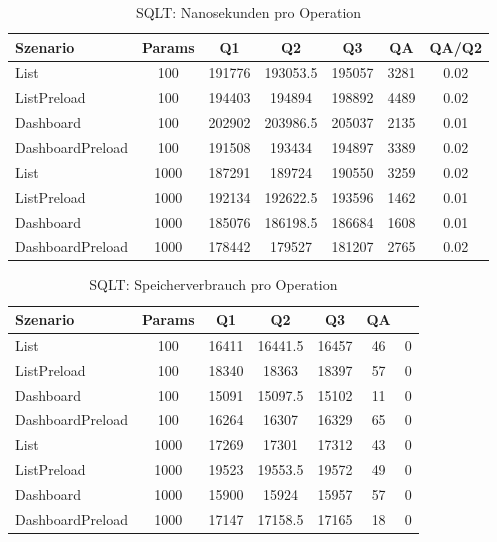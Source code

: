 
\begin{table}[ht]
\centering
\caption{SQLT: Nanosekunden pro Operation}
\begin{tabular}{lcccccc}
\toprule
Szenario & Params & Q1 & Q2 & Q3 & QA & QA/Q2 \\
\midrule
	List & 100 & 191776 & 193053.5 & 195057 & 3281 & 0.02 \\
	ListPreload & 100 & 194403 & 194894 & 198892 & 4489 & 0.02 \\
	Dashboard & 100 & 202902 & 203986.5 & 205037 & 2135 & 0.01 \\
	DashboardPreload & 100 & 191508 & 193434 & 194897 & 3389 & 0.02 \\
	List & 1000 & 187291 & 189724 & 190550 & 3259 & 0.02 \\
	ListPreload & 1000 & 192134 & 192622.5 & 193596 & 1462 & 0.01 \\
	Dashboard & 1000 & 185076 & 186198.5 & 186684 & 1608 & 0.01 \\
	DashboardPreload & 1000 & 178442 & 179527 & 181207 & 2765 & 0.02 \\
\bottomrule
\end{tabular}
\label{tab:benchmark_sqlt_nsperop}
\end{table}
	
\begin{table}[ht]
\centering
\caption{SQLT: Speicherverbrauch pro Operation}
\begin{tabular}{lccccc}
\toprule
Szenario & Params & Q1 & Q2 & Q3 & QA \\
\midrule
	List & 100 & 16411 & 16441.5 & 16457 & 46 & 0 \\
	ListPreload & 100 & 18340 & 18363 & 18397 & 57 & 0 \\
	Dashboard & 100 & 15091 & 15097.5 & 15102 & 11 & 0 \\
	DashboardPreload & 100 & 16264 & 16307 & 16329 & 65 & 0 \\
	List & 1000 & 17269 & 17301 & 17312 & 43 & 0 \\
	ListPreload & 1000 & 19523 & 19553.5 & 19572 & 49 & 0 \\
	Dashboard & 1000 & 15900 & 15924 & 15957 & 57 & 0 \\
	DashboardPreload & 1000 & 17147 & 17158.5 & 17165 & 18 & 0 \\
\bottomrule
\end{tabular}
\label{tab:benchmark_sqlt_bytesperop}
\end{table}
	
